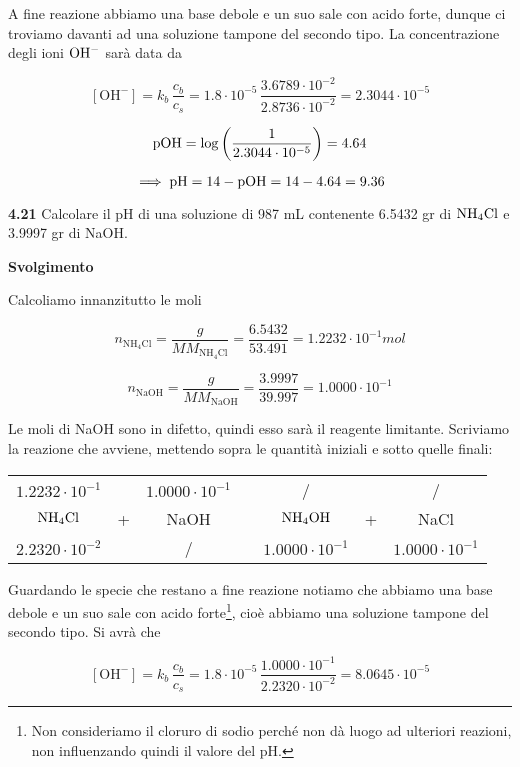 A fine reazione abbiamo una base debole e un suo sale con acido forte, dunque ci troviamo davanti ad una soluzione tampone del secondo tipo. La concentrazione degli ioni $\rm OH^-$ sarà data da

$$[\text{OH}^-]=k_b\,\frac{c_b}{c_s}
=1.8 \cdot 10^{-5}\,\frac{3.6789 \cdot 10^{-2}}{2.8736 \cdot 10^{-2}}
=2.3044 \cdot 10^{-5}$$

$$\rm pOH=\log \left( \frac{1}{2.3044 \cdot 10^{-5}} \right)=4.64$$

$$\implies \rm pH=14-pOH=14-4.64=9.36$$

\vspace{0.2cm}\textbf{4.21} Calcolare il pH di una soluzione di 987 mL contenente 6.5432 gr di $\rm NH_4Cl$ e 3.9997 gr di NaOH.

\vspace{0.2cm}\large\textbf{Svolgimento}\normalsize

\vspace{0.2cm}Calcoliamo innanzitutto le moli

$$n_{\text{NH}_4\text{Cl}}=\frac{g}{MM_{\text{NH}_4\text{Cl}}}=\frac{6.5432}{53.491}=1.2232 \cdot 10^{-1} mol$$

$$n_{\text{NaOH}}=\frac{g}{MM_{\text{NaOH}}}=\frac{3.9997}{39.997}=1.0000 \cdot 10^{-1}$$

Le moli di NaOH sono in difetto, quindi esso sarà il reagente limitante. Scriviamo la reazione che avviene, mettendo sopra le quantità iniziali e sotto quelle finali:

\begin{center}
    \begin{tabular}{ccccccc}
        $1.2232 \cdot 10^{-1}$ &  & $1.0000 \cdot 10^{-1}$ & & / & & /\\
        $\rm NH_4Cl$ & + & NaOH & \ce{->} & $\rm NH_4OH$ & + & NaCl\\
        $2.2320 \cdot 10^{-2}$ &  & / & & $1.0000 \cdot 10^{-1}$ & &$1.0000 \cdot 10^{-1}$\\
    \end{tabular}
\end{center}

Guardando le specie che restano a fine reazione notiamo che abbiamo una base debole e un suo sale con acido forte\footnote{Non consideriamo il cloruro di sodio perché non dà luogo ad ulteriori reazioni, non influenzando quindi il valore del pH.}, cioè abbiamo una soluzione tampone del secondo tipo. Si avrà che

$$[\text{OH}^-]=k_b\,\frac{c_b}{c_s}
=1.8 \cdot 10^{-5}\,\frac{1.0000 \cdot 10^{-1}}{2.2320 \cdot 10^{-2}}
=8.0645 \cdot 10^{-5}$$

